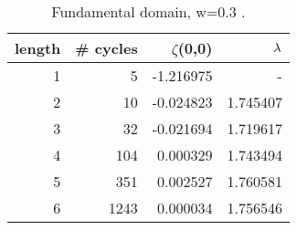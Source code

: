 {%
%
\begin{table}
{\small
\begin{tabular}{|r|r|r|r|}
\hline
length & \# cycles & $\zeta$(0,0) & $\lambda$ \\ \hline\hline
1      &    5     &  -1.216975 &     -    \\
2      &   10     &  -0.024823 & 1.745407 \\
3      &   32     &  -0.021694 & 1.719617 \\
4      &  104     &   0.000329 & 1.743494 \\
5      &  351     &   0.002527 & 1.760581 \\
6      & 1243     &   0.000034 & 1.756546 \\ \hline
\end{tabular}
\caption[]{\small
Fundamental domain, w=0.3 .
}
\label{t-diff-5a}
}  %
\end{table}
%
%



}
